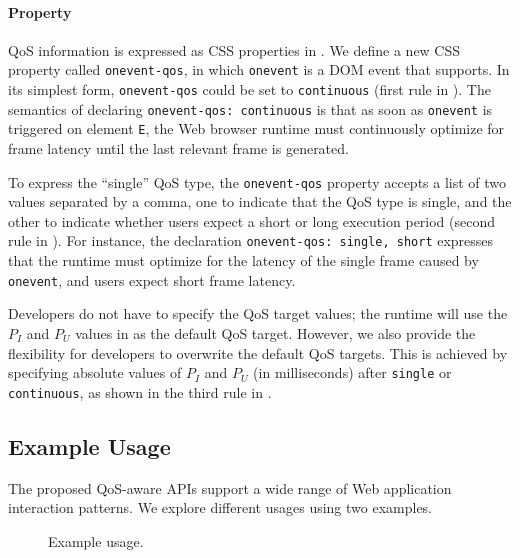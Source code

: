 \paragraph{Property} QoS information is expressed as CSS properties in \greenweb. We define a new CSS property called \texttt{onevent-qos}, in which \texttt{onevent} is a DOM event that \greenweb supports. In its simplest form, \texttt{onevent-qos} could be set to \texttt{continuous} (first rule in ). The semantics of declaring \texttt{onevent-qos: continuous} is that as soon as \texttt{onevent} is triggered on element \texttt{E}, the Web browser runtime must continuously optimize for frame latency until the last relevant frame is generated.

To express the ``single'' QoS type, the \texttt{onevent-qos} property accepts a list of two values separated by a comma, one to indicate that the QoS type is single, and the other to indicate whether users expect a short or long execution period (second rule in ). For instance, the declaration \texttt{onevent-qos: single, short} expresses that the runtime must optimize for the latency of the single frame caused by \texttt{onevent}, and users expect short frame latency.

Developers do not have to specify the QoS target values; the \greenweb runtime will use the $P_I$ and $P_U$ values in  as the default QoS target. However, we also provide the flexibility for developers to overwrite the default QoS targets. This is achieved by specifying absolute values of $P_I$ and $P_U$ (in milliseconds) after \texttt{single} or \texttt{continuous}, as shown in the third rule in .

\subsection{Example Usage}
\label{sec:lang:spec:ex}

The proposed QoS-aware \greenweb APIs support a wide range of Web application interaction patterns. We explore different usages using two examples.

\begin{figure}[t]
\centering
{}
\hspace*{15pt}
\caption{Example \greenweb usage.}
\label{fig:ex}
\end{figure}

